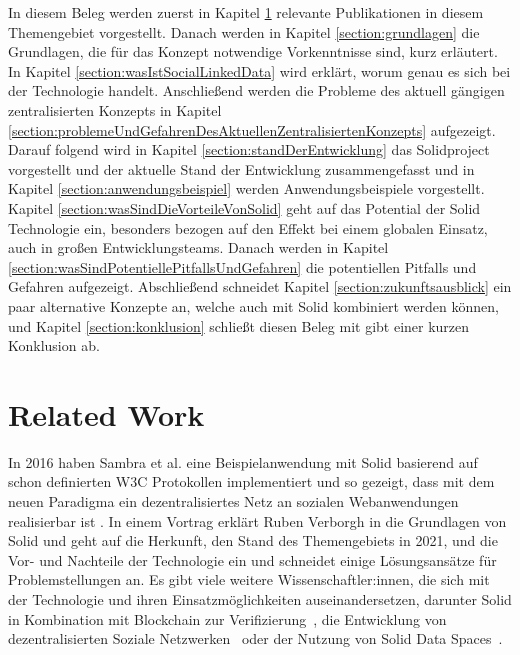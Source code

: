 \documentclass[acmtog]{acmart}
\begin{document}
In diesem Beleg werden zuerst in Kapitel \ref{section:relatedWork} relevante Publikationen in diesem Themengebiet vorgestellt. Danach werden in Kapitel \ref{section:grundlagen} die Grundlagen, die für das Konzept notwendige Vorkenntnisse sind, kurz erläutert. In Kapitel \ref{section:wasIstSocialLinkedData} wird erklärt, worum genau es sich bei der Technologie handelt. Anschließend werden die Probleme des aktuell gängigen zentralisierten Konzepts in Kapitel \ref{section:problemeUndGefahrenDesAktuellenZentralisiertenKonzepts} aufgezeigt.  Darauf folgend wird in Kapitel \ref{section:standDerEntwicklung} das Solidproject vorgestellt und der aktuelle Stand der Entwicklung zusammengefasst und in Kapitel \ref{section:anwendungsbeispiel} werden Anwendungsbeispiele vorgestellt. Kapitel \ref{section:wasSindDieVorteileVonSolid} geht auf das Potential der Solid Technologie ein, besonders bezogen auf den Effekt bei einem globalen Einsatz, auch in großen Entwicklungsteams. Danach werden in Kapitel \ref{section:wasSindPotentiellePitfallsUndGefahren} die potentiellen Pitfalls und Gefahren aufgezeigt. Abschließend schneidet Kapitel \ref{section:zukunftsausblick} ein paar alternative Konzepte an, welche auch mit Solid kombiniert werden können, und Kapitel \ref{section:konklusion} schließt diesen Beleg mit gibt einer kurzen Konklusion ab.


\section{Related Work}\label{section:relatedWork}

In 2016 haben Sambra et al. eine Beispielanwendung mit Solid basierend auf schon definierten W3C Protokollen implementiert und so gezeigt, dass mit dem neuen Paradigma ein dezentralisiertes Netz an sozialen Webanwendungen realisierbar ist \cite{sambra2016solid}.
In einem Vortrag erklärt Ruben Verborgh in \cite{MarcoNeumann.2021} die Grundlagen von Solid und geht auf die Herkunft, den Stand des Themengebiets in 2021, und die Vor- und Nachteile der Technologie ein und schneidet einige Lösungsansätze für Problemstellungen an.
Es gibt viele weitere Wissenschaftler:innen, die sich mit der Technologie und ihren Einsatzmöglichkeiten auseinandersetzen, darunter Solid in Kombination mit Blockchain zur Verifizierung~\cite{ramachandran2020towards}, die Entwicklung von dezentralisierten Soziale Netzwerken~\cite{yeung2023decentralization} oder der Nutzung von Solid Data Spaces~\cite{meckler2023web}.
\end{document}
